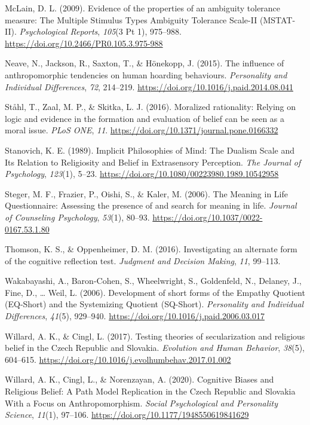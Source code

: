 \documentclass[
  letterpaper,
]{scrbook}
\newlength{\cslhangindent}
\newenvironment{CSLReferences}[2] %
 {\begin{list}{}{%
  \setlength{\itemindent}{0pt}
  \setlength{\leftmargin}{0pt}
  \setlength{\parsep}{0pt}
  \ifodd #1
   \setlength{\leftmargin}{\cslhangindent}
   \setlength{\itemindent}{-1\cslhangindent}
  \fi
  \setlength{\itemsep}{#2\baselineskip}}}
 {\end{list}}
\begin{document}
\begin{CSLReferences}{1}{0}
McLain, D. L. (2009). Evidence of the properties of an ambiguity
tolerance measure: The {Multiple Stimulus Types Ambiguity Tolerance
Scale-II} ({MSTAT-II}). \emph{Psychological Reports}, \emph{105}(3 Pt
1), 975--988. \url{https://doi.org/10.2466/PR0.105.3.975-988}

Neave, N., Jackson, R., Saxton, T., \& Hönekopp, J. (2015). The
influence of anthropomorphic tendencies on human hoarding behaviours.
\emph{Personality and Individual Differences}, \emph{72}, 214--219.
\url{https://doi.org/10.1016/j.paid.2014.08.041}

Ståhl, T., Zaal, M. P., \& Skitka, L. J. (2016). Moralized rationality:
{Relying} on logic and evidence in the formation and evaluation of
belief can be seen as a moral issue. \emph{PLoS ONE}, \emph{11}.
\url{https://doi.org/10.1371/journal.pone.0166332}

Stanovich, K. E. (1989). Implicit {Philosophies} of {Mind}: {The Dualism
Scale} and {Its Relation} to {Religiosity} and {Belief} in {Extrasensory
Perception}. \emph{The Journal of Psychology}, \emph{123}(1), 5--23.
\url{https://doi.org/10.1080/00223980.1989.10542958}

Steger, M. F., Frazier, P., Oishi, S., \& Kaler, M. (2006). The
{Meaning} in {Life Questionnaire}: {Assessing} the presence of and
search for meaning in life. \emph{Journal of Counseling Psychology},
\emph{53}(1), 80--93. \url{https://doi.org/10.1037/0022-0167.53.1.80}

Thomson, K. S., \& Oppenheimer, D. M. (2016). Investigating an alternate
form of the cognitive reflection test. \emph{Judgment and Decision
Making}, \emph{11}, 99--113.

Wakabayashi, A., Baron-Cohen, S., Wheelwright, S., Goldenfeld, N.,
Delaney, J., Fine, D., \ldots{} Weil, L. (2006). Development of short
forms of the {Empathy Quotient} ({EQ-Short}) and the {Systemizing
Quotient} ({SQ-Short}). \emph{Personality and Individual Differences},
\emph{41}(5), 929--940. \url{https://doi.org/10.1016/j.paid.2006.03.017}

Willard, A. K., \& Cingl, L. (2017). Testing theories of secularization
and religious belief in the {Czech Republic} and {Slovakia}.
\emph{Evolution and Human Behavior}, \emph{38}(5), 604--615.
\url{https://doi.org/10.1016/j.evolhumbehav.2017.01.002}

Willard, A. K., Cingl, L., \& Norenzayan, A. (2020). Cognitive {Biases}
and {Religious Belief}: {A Path Model Replication} in the {Czech
Republic} and {Slovakia With} a {Focus} on {Anthropomorphism}.
\emph{Social Psychological and Personality Science}, \emph{11}(1),
97--106. \url{https://doi.org/10.1177/1948550619841629}

\end{CSLReferences}
\end{document}
